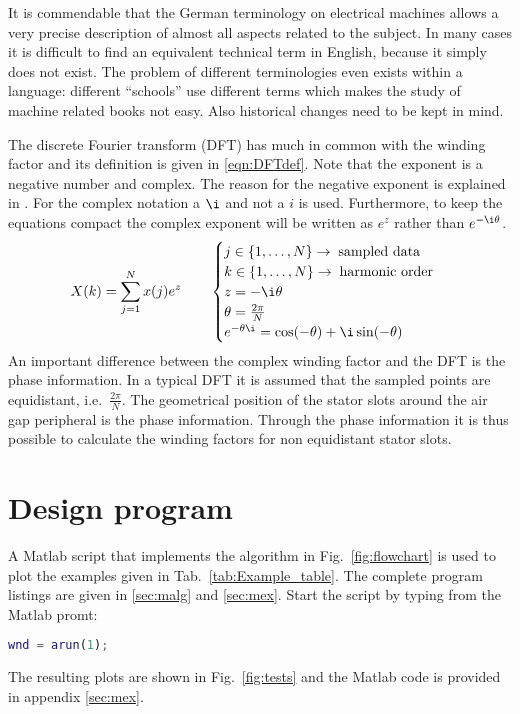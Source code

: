 It is commendable that the German terminology on electrical machines allows a very precise description of almost all aspects related to the subject. In many cases it is difficult to find an equivalent technical term in English, because it simply does not exist. The problem of different terminologies even exists within a language: different ``schools'' use different terms which makes the study of machine related books not easy. Also historical changes need to be kept in mind.


The discrete Fourier transform (DFT) has much in common with the winding factor and its definition is given in \eqref{eqn:DFTdef}. Note that the exponent is a negative number and complex. The reason for the negative exponent is explained in \cite{REF-01048,REF-01049,REF-01050}. For the complex notation a $\i$ and not a $i$ is used. Furthermore, to keep the equations compact the complex exponent will be written as $e^z$ rather than $e^{-\i\theta}$.
\begin{equation}\label{eqn:DFTdef}
  X(k)=\sum_{j=1}^{N}x(j)e^z
  \qquad
  \begin{cases}
    j \in \left\{1,\ldots,N  \right\} \rightarrow \; \mbox{sampled data}\\
  	k \in \left\{1,\ldots,N  \right\} \rightarrow \; \mbox{harmonic order}\\
    z = -\i\theta   \\
  	\theta = \frac{2\pi}{N}   \\
  	e^{-\theta \i} = \cos (-\theta) + \i \sin (-\theta)
  \end{cases}
\end{equation}
An important difference between the complex winding factor and the DFT is the phase information. In a typical DFT it is assumed that the sampled points are equidistant, i.e.~$\frac{2\pi}{N}$. The geometrical position of the stator slots around the air gap peripheral is the phase information. Through the phase information it is thus possible to calculate the winding factors for non equidistant stator slots. 

\section{Design program}
A Matlab script that implements the algorithm in Fig.~\ref{fig:flowchart} is used to plot the examples given in Tab.~\ref{tab:Example_table}. The complete program listings are given in \ref{sec:malg} and \ref{sec:mex}. Start the script by typing from the Matlab promt:

\begin{lstlisting}[language=matlab]
wnd = arun(1);
\end{lstlisting}
The resulting plots are shown in Fig.~\ref{fig:tests} and the Matlab code is provided in appendix \ref{sec:mex}.

